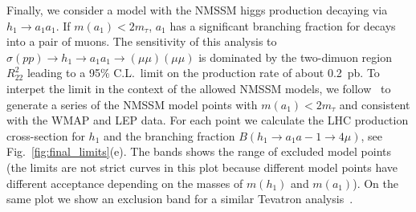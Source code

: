 Finally, we consider a model with the NMSSM higgs production decaying via $h_1 \to a_1 a_1$. If $m(a_1)<2m_\tau$, $a_1$ has a significant branching fraction for decays into a pair of muons. The sensitivity of this analysis to $\sigma(pp) \to h_1 \to a_1 a_1 \to (\mu\mu) (\mu\mu)$ is dominated by the two-dimuon region $R^2_{22}$ leading to a 95\% C.L.\ limit on the production rate of about 0.2~pb. To interpet the limit in the context of the allowed NMSSM models, we follow~\cite{Belyaev:nmssm} to generate a series of the NMSSM model points with $m(a_1)<2m_\tau$ and consistent with the WMAP and LEP data. For each point we calculate the LHC production cross-section for $h_1$ and the branching fraction $B(h_1 \to a_1 a-1 \to 4\mu)$, see Fig.~\ref{fig:final_limits}(e). The bands shows the range of excluded model points (the limits are not strict curves in this plot because different model points have different acceptance depending on the masses of $m(h_1)$ and $m(a_1)$). On the same plot we show an exclusion band for a similar Tevatron analysis~\cite{Abazov:2009yi}.
